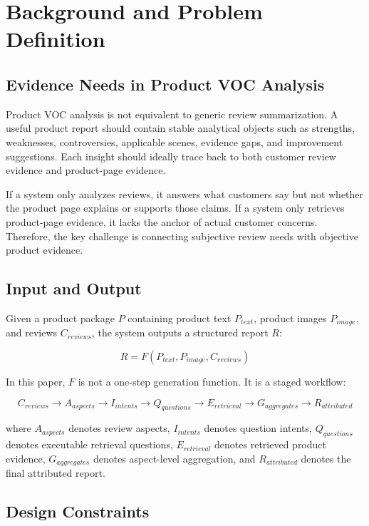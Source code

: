 \documentclass[11pt]{article}
\begin{document}
\section{Background and Problem Definition}
\subsection{Evidence Needs in Product VOC Analysis}

Product VOC analysis is not equivalent to generic review summarization. A useful product report should contain stable analytical objects such as strengths, weaknesses, controversies, applicable scenes, evidence gaps, and improvement suggestions. Each insight should ideally trace back to both customer review evidence and product-page evidence.

If a system only analyzes reviews, it answers what customers say but not whether the product page explains or supports those claims. If a system only retrieves product-page evidence, it lacks the anchor of actual customer concerns. Therefore, the key challenge is connecting subjective review needs with objective product evidence.

\subsection{Input and Output}

Given a product package \(P\) containing product text \(P_{text}\), product images \(P_{image}\), and reviews \(C_{reviews}\), the system outputs a structured report \(R\):

\[
R = F(P_{text}, P_{image}, C_{reviews})
\]

In this paper, \(F\) is not a one-step generation function. It is a staged workflow:

\[
C_{reviews} \rightarrow A_{aspects} \rightarrow I_{intents} \rightarrow Q_{questions} \rightarrow E_{retrieval} \rightarrow G_{aggregates} \rightarrow R_{attributed}
\]

where \(A_{aspects}\) denotes review aspects, \(I_{intents}\) denotes question intents, \(Q_{questions}\) denotes executable retrieval questions, \(E_{retrieval}\) denotes retrieved product evidence, \(G_{aggregates}\) denotes aspect-level aggregation, and \(R_{attributed}\) denotes the final attributed report.

\subsection{Design Constraints}
\end{document}
